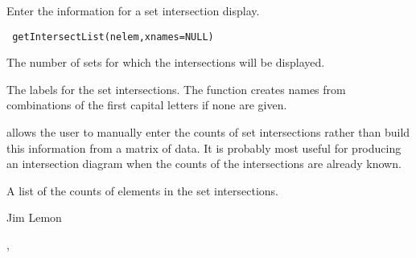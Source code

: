 \begin{Description}\relax
Enter the information for a set intersection display.
\end{Description}
\begin{Usage}
\begin{verbatim}
 getIntersectList(nelem,xnames=NULL)
\end{verbatim}
\end{Usage}
\begin{Arguments}
\begin{ldescription}
\item[\code{nelem}] The number of sets for which the intersections will be displayed.
\item[\code{xnames}] The labels for the set intersections. The function creates names
from combinations of the first  capital letters if none are 
given.
\end{ldescription}
\end{Arguments}
\begin{Details}\relax
{} allows the user to manually enter the counts of
set intersections rather than build this information from a matrix of data.
It is probably most useful for producing an intersection diagram when the
counts of the intersections are already known.
\end{Details}
\begin{Value}
A list of the counts of elements in the set intersections.
\end{Value}
\begin{Author}\relax
Jim Lemon
\end{Author}
\begin{SeeAlso}\relax
{}, 
\end{SeeAlso}


